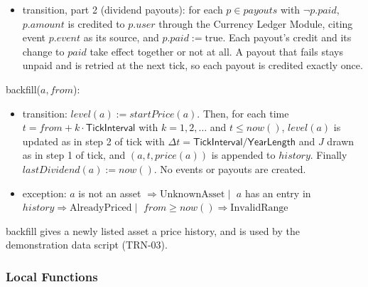 \documentclass[12pt, titlepage]{article}
\begin{document}
\begin{itemize}
\begin{enumerate}
    $q > 0$, $(e.\mathit{id}, u, q \cdot d, \mathrm{false})$ is added to
    $\mathit{payouts}$. In either case $\mathit{lastDividend}(a) := n$.
  \item $\mathit{lastTick} := n$.
  \end{enumerate}
  If any of steps 1 to 5 fails, the state is unchanged and the failure is
  written to $\mathit{log}$. The last valid prices stay in effect, and the
  next tick covers the whole time since $\mathit{lastTick}$ (BUC 6).
\item transition, part 2 (dividend payouts): for each $p \in
  \mathit{payouts}$ with $\neg p.\mathit{paid}$, $p.\mathit{amount}$ is
  credited to $p.\mathit{user}$ through the Currency Ledger Module, citing
  event $p.\mathit{event}$ as its source, and $p.\mathit{paid} :=
  \mathrm{true}$. Each payout's credit and its change to $\mathit{paid}$
  take effect together or not at all. A payout that fails stays unpaid and
  is retried at the next tick, so each payout is credited exactly once.
\end{itemize}

\noindent backfill($a, \mathit{from}$):
\begin{itemize}
\item transition: $\mathit{level}(a) := \mathit{startPrice}(a)$. Then, for
  each time $t = \mathit{from} + k \cdot \textsf{TickInterval}$ with $k = 1,
  2, \ldots$ and $t \leq \mathit{now}()$, $\mathit{level}(a)$ is updated as in
  step 2 of tick with $\Delta t = \textsf{TickInterval} /
  \textsf{YearLength}$ and $J$ drawn as in step 1 of tick, and $(a, t,
  \mathit{price}(a))$ is appended to $\mathit{history}$. Finally
  $\mathit{lastDividend}(a) := \mathit{now}()$. No events or payouts are
  created.
\item exception: $a$ is not an asset $\Rightarrow \mathrm{UnknownAsset}
  \mid{}$ $a$ has an entry in $\mathit{history} \Rightarrow
  \mathrm{AlreadyPriced} \mid{}$ $\mathit{from} \geq \mathit{now}()
  \Rightarrow \mathrm{InvalidRange}$
\end{itemize}

\noindent backfill gives a newly listed asset a price history, and is used by
the demonstration data script (TRN-03).

\subsubsection{Local Functions}
\end{document}
